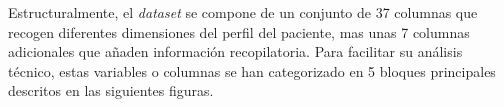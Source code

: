 \documentclass[12pt,a4paper,onecolumn,oneside]{report}
\begin{document}
Estructuralmente, el \textit{dataset} se compone de un conjunto de 37 columnas que recogen diferentes dimensiones del perfil del paciente, mas unas 7 columnas adicionales que añaden información recopilatoria. Para facilitar su análisis técnico, estas variables o columnas se han categorizado en 5 bloques principales descritos en las siguientes figuras.

\end{document}
